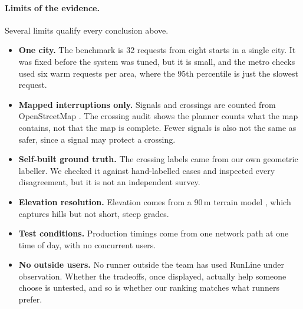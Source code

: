 \paragraph{Limits of the evidence.}
Several limits qualify every conclusion above.
\begin{itemize}
\item \textbf{One city.} The benchmark is 32 requests from eight starts in a
  single city. It was fixed before the system was tuned, but it is small, and
  the metro checks used six warm requests per area, where the 95th percentile
  is just the slowest request.
\item \textbf{Mapped interruptions only.} Signals and crossings are counted
  from OpenStreetMap \citep{osmwiki2026signals}. The crossing audit shows the
  planner counts what the map contains, not that the map is complete. Fewer
  signals is also not the same as safer, since a signal may protect a
  crossing.
\item \textbf{Self-built ground truth.} The crossing labels came from our own
  geometric labeller. We checked it against hand-labelled cases and inspected
  every disagreement, but it is not an independent survey.
\item \textbf{Elevation resolution.} Elevation comes from a 90\,m terrain
  model \citep{copernicus2022dem}, which captures hills but not short, steep
  grades.
\item \textbf{Test conditions.} Production timings come from one network
  path at one time of day, with no concurrent users.
\item \textbf{No outside users.} No runner outside the team has used
  RunLine under observation. Whether the tradeoffs, once displayed, actually
  help someone choose is untested, and so is whether our ranking matches
  what runners prefer.
\end{itemize}
